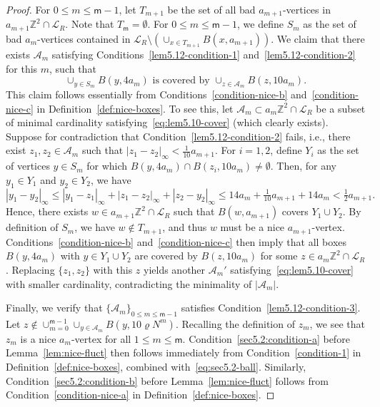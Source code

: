 \documentclass[a4paper]{article}
\numberwithin{equation}{section}
\numberwithin{equation}{section}
\renewcommand{\1}{\mathbf{1}}
\begin{document}
\begin{proof}
    For $0 \leq m \leq \mathsf m - 1$, let $T_{m+1}$ be the set of all bad $a_{m+1}$-vertices in $a_{m+1} \mathbb{Z}^2 \cap \mathscr{L}_R$. Note that $T_{\mathsf m} = \emptyset$. For $0 \leq m \leq \mathsf m - 1$, we define $S_m$ as the set of bad $a_m$-vertices contained in $\mathscr{L}_R \setminus (\cup_{x \in T_{m+1}} B(x,a_{m+1}))$.
    We claim that there exists $\mathcal{A}_m$ satisfying Conditions~\eqref{lem5.12-condition-1} and~\eqref{lem5.12-condition-2} for this $m$, such that
    \begin{equation}\label{eq:lem5.10-cover}
        \cup_{y \in S_m} B(y,4a_m) \mbox{ is covered by } \cup_{z \in \mathcal A_m} B(z,10a_m).
    \end{equation} 
    This claim follows essentially from Conditions~\eqref{condition-nice-b} and~\eqref{condition-nice-c} in Definition~\ref{def:nice-boxes}. To see this, let $\mathcal A_m \subset a_m \mathbb Z^2 \cap \mathscr L_R$ be a subset of minimal cardinality satisfying~\eqref{eq:lem5.10-cover} (which clearly exists). Suppose for contradiction that Condition~\eqref{lem5.12-condition-2} fails, i.e., there exist $z_1,z_2 \in \mathcal A_m$ such that $|z_1-z_2|_\infty < \frac{1}{10} a_{m+1}$. For $i=1,2$, define $Y_i$ as the set of vertices $y \in S_m$ for which $B(y,4a_m) \cap B(z_i,10a_m) \neq \emptyset$. Then, for any $y_1 \in Y_1$ and $y_2 \in Y_2$, we have
    \[ |y_1-y_2|_\infty \le |y_1-z_1|_\infty+|z_1-z_2|_\infty+|z_2-y_2|_\infty \le 14a_m+\tfrac{1}{10} a_{m+1}+14a_m < \tfrac{1}{2} a_{m+1}. \]
    Hence, there exists $w \in a_{m+1} \mathbb Z^2 \cap \mathscr L_R$ such that $B(w,a_{m+1})$ covers $Y_1 \cup Y_2$. By definition of $S_m$, we have $w \not \in T_{m+1}$, and thus $w$ must be a nice $a_{m+1}$-vertex. Conditions~\eqref{condition-nice-b} and~\eqref{condition-nice-c} then imply that all boxes $B(y, 4 a_m)$ with $y \in Y_1 \cup Y_2$ are covered by $B(z,10 a_m)$ for some $z \in a_m \mathbb{Z}^2 \cap \mathscr{L}_R$. Replacing $\{z_1,z_2\}$ with this $z$ yields another $\mathcal A_m'$ satisfying~\eqref{eq:lem5.10-cover} with smaller cardinality, contradicting the minimality of $|\mathcal A_m|$.

    Finally, we verify that $\{\mathcal A_m\}_{0 \le m \le \mathsf m-1}$ satisfies Condition~\eqref{lem5.12-condition-3}. Let $z \notin \cup_{m=0}^{\mathsf{m} - 1} \cup_{y \in \mathcal{A}_m} B(y, 10 \varrho N^m)$. Recalling the definition of $z_m$, we see that $z_m$ is a nice $a_m$-vertex for all $1 \leq m \leq \mathsf m$. Condition~\eqref{sec5.2:condition-a} before Lemma~\ref{lem:nice-fluct} then follows immediately from Condition~\eqref{condition-1} in Definition~\ref{def:nice-boxes}, combined with~\eqref{eq:sec5.2-ball}. Similarly, Condition~\eqref{sec5.2:condition-b} before Lemma~\ref{lem:nice-fluct} follows from Condition~\eqref{condition-nice-a} in Definition~\ref{def:nice-boxes}.
\end{proof}
\end{document}

